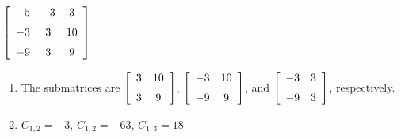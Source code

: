 {$\left[ \begin {array}{ccc} -5&-3&3\\\noalign{\medskip}-3&3&10
\\\noalign{\medskip}-9&3&9\end {array} \right] $} 
{\begin{enumerate}
\item The submatrices are 
$\left[ \begin {array}{cc} 3&10\\\noalign{\medskip}3&9\end {array}
 \right]$, 
 $\left[ \begin {array}{cc} -3&10\\\noalign{\medskip}-9&9\end {array}
 \right]$, and 
 $\left[ \begin {array}{cc} -3&3\\\noalign{\medskip}-9&3\end {array}
 \right]$, respectively.
 \item	$C_{1,2}=-3$, $C_{1,2}=-63$, $C_{1,3}=18$
 \end{enumerate}
}

  

 


